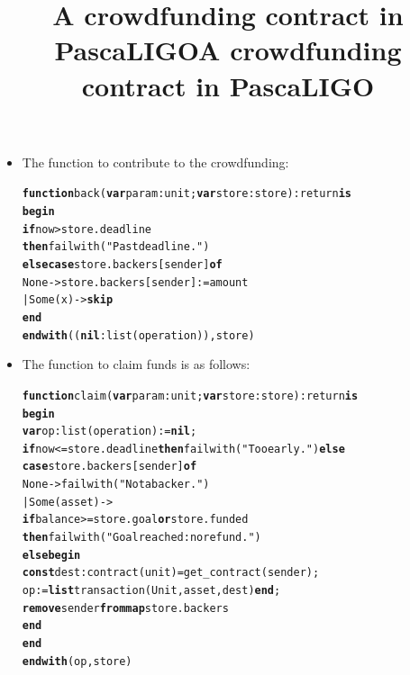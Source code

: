 \documentclass[wide]{slides}
\begin{document}
\begin{slide}
  \title{A crowdfunding contract in PascaLIGO}

  \begin{itemize}

  \item The function to contribute to the crowdfunding:
    \smallskip
    \begin{alltt}
\textbf{function} back (\textbf{var} param : unit; \textbf{var} store : store) : return \textbf{is}
  \textbf{begin}
    \textbf{if}   now > store.deadline
    \textbf{then} failwith ("Past deadline.")
    \textbf{else} \textbf{case} store.backers[sender] \textbf{of}
             None -> store.backers[sender] := amount
          | Some (x) -> \textbf{skip}
          \textbf{end}
  \textbf{end with} ((\textbf{nil}: list (operation)), store)
    \end{alltt}

  \end{itemize}

\end{slide}

\begin{slide}
  \title{A crowdfunding contract in PascaLIGO}

  \begin{itemize}

    \item The function to claim funds is as follows:
    \smallskip
      \begin{alltt}
\textbf{function} claim (\textbf{var} param : unit; \textbf{var} store : store) : return \textbf{is}
  \textbf{begin}
    \textbf{var} op : list (operation) := \textbf{nil};
    \textbf{if} now <= store.deadline \textbf{then} failwith ("Too early.") \textbf{else}
    \textbf{case} store.backers[sender] \textbf{of}
        None -> failwith ("Not a backer.")
    | Some (asset) ->
          \textbf{if} balance >= store.goal \textbf{or} store.funded
          \textbf{then} failwith ("Goal reached: no refund.")
          \textbf{else} \textbf{begin}
                  \textbf{const} dest : contract (unit) = get_contract (sender);
                  op := \textbf{list} transaction (Unit, asset, dest) \textbf{end};
                  \textbf{remove} sender \textbf{from map} store.backers
                \textbf{end}
     \textbf{end}
  \textbf{end with} (op, store)
      \end{alltt}
  \end{itemize}

\end{slide}
\end{document}
